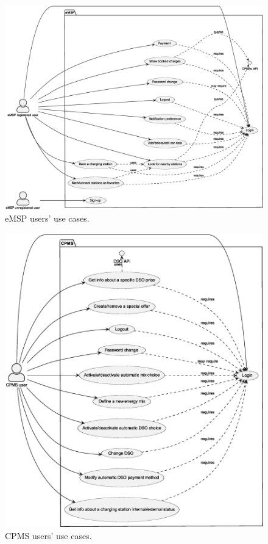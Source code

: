 \begin{figure}[h!]
    \centering
    \includegraphics[width=\columnwidth]{./images/diagrams/usecases/emsp}
    \caption{eMSP users' use cases.}
\end{figure}

\begin{figure}[h!]
    \centering
    \includegraphics[width=0.8\columnwidth]{./images/diagrams/usecases/cpms}
    \caption{CPMS users' use cases.}
\end{figure}

